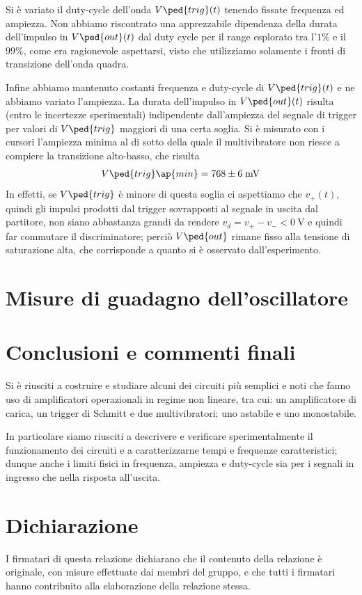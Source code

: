 \documentclass[10pt, a4paper, italian]{article}
\begin{document}
Si è variato il duty-cycle dell'onda $V\ped{trig} (t)$ tenendo fissate
frequenza ed ampiezza. Non abbiamo riscontrato una apprezzabile dipendenza
della durata dell'impulso in $V\ped{out} (t)$ dal duty cycle per il range
esplorato tra l'$1 \%$ e il $99 \%$, come era ragionevole aspettarsi, visto che
utilizziamo solamente i fronti di transizione dell'onda quadra.

Infine abbiamo mantenuto costanti frequenza e duty-cycle di $V\ped{trig} (t)$
e ne abbiamo variato l'ampiezza. La durata dell'impulso in $V\ped{out} (t)$
risulta (entro le incertezze sperimentali) indipendente dall'ampiezza del
segnale di trigger per valori di $V\ped{trig}$ maggiori di una certa soglia.
Si è misurato con i cursori l'ampiezza minima al di sotto della quale
il multivibratore non riesce a compiere la transizione alto-basso,
che risulta
\begin{align*}
V\ped{trig}\ap{min} = 768 \pm 6 \; \si{m\V}
\end{align*}
In effetti, se $V\ped{trig}$ è minore di questa soglia ci aspettiamo
che $v_+ (t)$, quindi gli impulsi prodotti dal trigger sovrapposti al segnale
in uscita dal partitore, non siano abbastanza grandi da rendere
$v_d = v_+ - v_- < \SI{0}{\V}$ e quindi far commutare il discriminatore; perciò
$V\ped{out}$ rimane fisso alla tensione di saturazione alta, che
corrisponde a quanto si è osservato dall'esperimento.

\section{Misure di guadagno dell'oscillatore}

\section*{Conclusioni e commenti finali}
Si è riusciti a costruire e studiare alcuni dei circuiti più semplici e noti
che fanno uso di amplificatori operazionali in regime non lineare, tra cui:
un amplificatore di carica, un trigger di Schmitt e due multivibratori; uno
astabile e uno monostabile.

In particolare siamo riusciti a descrivere e verificare sperimentalmente il
funzionamento dei circuiti e a caratterizzarne tempi e frequenze
caratteristici; dunque anche i limiti fisici in frequenza, ampiezza e
duty-cycle sia per i segnali in ingresso che nella risposta all'uscita.

\section*{Dichiarazione}
I firmatari di questa relazione dichiarano che il contenuto della relazione \`e
originale, con misure effettuate dai membri del gruppo, e che tutti i firmatari
hanno contribuito alla elaborazione della relazione stessa.
\end{document}
